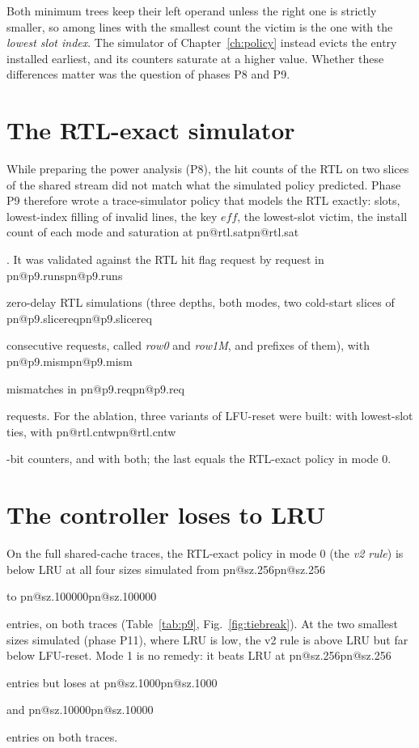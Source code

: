 \documentclass[11pt,a4paper]{report}
\makeatletter
\DeclareRobustCommand{\R}[1]{\ifcsname pn@#1\endcsname\csname pn@#1\endcsname\else
  \PackageError{report}{number key '#1' is not defined in macros.tex}{Run tools/make_paper_macros.py --target report}\fi}
\makeatother
\begin{document}
Both minimum trees keep their left operand unless the right one is strictly smaller, so among lines with the smallest
count the victim is the one with the \emph{lowest slot index}. The simulator of Chapter~\ref{ch:policy} instead
evicts the entry installed earliest, and its counters saturate at a higher value. Whether these differences matter
was the question of phases P8 and P9.

\section{The RTL-exact simulator}
While preparing the power analysis (P8), the hit counts of the RTL on two slices of the shared stream did not match
what the simulated policy predicted. Phase P9 therefore wrote a trace-simulator policy that models the RTL exactly:
slots, lowest-index filling of invalid lines, the key $\mathit{eff}$, the lowest-slot victim, the install count of each
mode and saturation at \R{rtl.sat}. It was validated against the RTL hit flag request by request in \R{p9.runs}
zero-delay RTL simulations (three depths, both modes, two cold-start slices of \R{p9.slicereq} consecutive requests,
called \emph{row0} and \emph{row1M}, and prefixes of them), with \R{p9.mism} mismatches in \R{p9.req} requests. For the
ablation, three variants of LFU-reset were built: with lowest-slot ties, with \R{rtl.cntw}-bit counters, and with
both; the last equals the RTL-exact policy in mode 0.

\section{The controller loses to LRU}
On the full shared-cache traces, the RTL-exact policy in mode 0 (the \emph{v2 rule}) is below LRU at all four sizes
simulated from \R{sz.256} to \R{sz.100000} entries, on both traces (Table~\ref{tab:p9}, Fig.~\ref{fig:tiebreak}). At
the two smallest sizes simulated (phase P11), where LRU is low, the v2 rule is above LRU but far below LFU-reset.
Mode 1 is no remedy: it beats LRU at \R{sz.256} entries but loses at \R{sz.1000} and \R{sz.10000} entries on both
traces.
\end{document}
